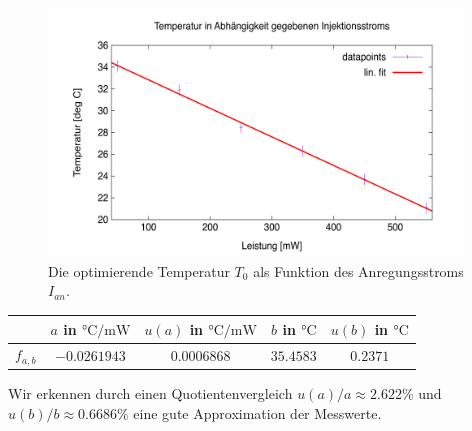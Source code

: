 \documentclass[../../main.tex]{subfiles}
\begin{document}
    \begin{figure}[H]
        \centering
        \includegraphics[width=11cm]{../../Bilddateien/1-2/Rasterung_EvalMin_chgI.png}
        \caption{Die optimierende Temperatur $T_0$ als Funktion des Anregungsstroms $I_{\textit{an}}$.}
        \label{fig:1-2:RasterungEvalMinChgI}
    \end{figure}

    \begin{table}[H]
        \centering
        \begin{tabular}{c|cc|cc}
            \hline
            & $a$ in $\si{\celsius\per\mW}$ & $u(a)$ in $\si{\celsius\per\mW}$ & $b$ in $\si{\celsius}$ & $u(b)$ in $\si{\celsius}$ \\
            \hline\hline
            $f_{a,b}$ & $-0.0261943$ & $0.0006868$ & $35.4583$ & $0.2371$ \\
            \hline
        \end{tabular}
    \end{table}
    Wir erkennen durch einen Quotientenvergleich $u(a)/a \approx 2.622\si{\percent}$ und $u(b)/b \approx 0.6686\si{\percent}$ eine gute Approximation der Messwerte. 
\end{document}
